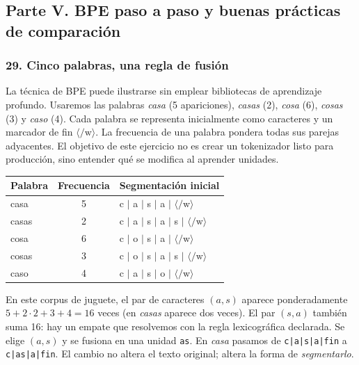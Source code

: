 

\subsection{Parte V. BPE paso a paso y buenas prácticas de comparación}

\subsubsection*{29. Cinco palabras, una regla de fusión}
La técnica de BPE puede ilustrarse sin emplear bibliotecas de aprendizaje profundo. Usaremos las palabras \emph{casa} (5 apariciones), \emph{casas} (2), \emph{cosa} (6), \emph{cosas} (3) y \emph{caso} (4). Cada palabra se representa inicialmente como caracteres y un marcador de fin $\langle/\mathrm{w}\rangle$. La frecuencia de una palabra pondera todas sus parejas adyacentes. El objetivo de este ejercicio no es crear un tokenizador listo para producción, sino entender qué se modifica al aprender unidades.

\begin{center}
\begin{tabular}{lcl}\toprule
Palabra & Frecuencia & Segmentación inicial\\\midrule
casa &5& c $\mid$ a $\mid$ s $\mid$ a $\mid$ $\langle/\mathrm{w}\rangle$\\
casas &2& c $\mid$ a $\mid$ s $\mid$ a $\mid$ s $\mid$ $\langle/\mathrm{w}\rangle$\\
cosa &6& c $\mid$ o $\mid$ s $\mid$ a $\mid$ $\langle/\mathrm{w}\rangle$\\
cosas &3& c $\mid$ o $\mid$ s $\mid$ a $\mid$ s $\mid$ $\langle/\mathrm{w}\rangle$\\
caso &4& c $\mid$ a $\mid$ s $\mid$ o $\mid$ $\langle/\mathrm{w}\rangle$\\\bottomrule
\end{tabular}
\end{center}
\noindent En este corpus de juguete, el par de caracteres $(a,s)$ aparece ponderadamente $5+2\cdot2+3+4=16$ veces (en \emph{casas} aparece dos veces). El par $(s,a)$ también suma 16: hay un empate que resolvemos con la regla lexicográfica declarada. Se elige $(a,s)$ y se fusiona en una unidad \texttt{as}. En \emph{casa} pasamos de \texttt{c|a|s|a|fin} a \texttt{c|as|a|fin}. El cambio no altera el texto original; altera la forma de \emph{segmentarlo}.

